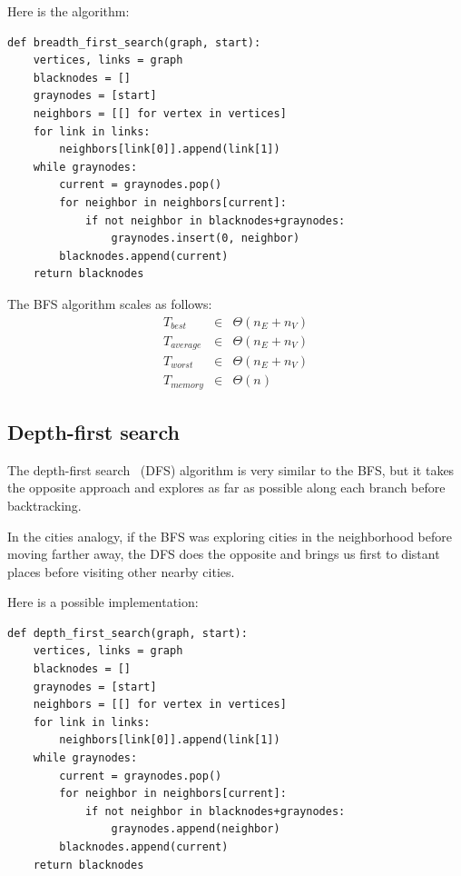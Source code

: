 \documentclass[justified, sixbynine]{tufte-book}
\def\ft{\small\tt}
\theoremstyle{plain}%
\newtheorem * {corollary}{Corollary}
\theoremstyle{definition}
\theoremstyle{remark}
\newtheorem * {remark}{Remark}
\newtheorem * {note}{Note}
\begin{document}
\begin{fullwidth}
Here is the algorithm:

\begin{lstlisting}[caption={in file: {\ft nlib.py}}]
def breadth_first_search(graph, start):
    vertices, links = graph
    blacknodes = []
    graynodes = [start]
    neighbors = [[] for vertex in vertices]
    for link in links:
        neighbors[link[0]].append(link[1])
    while graynodes:
        current = graynodes.pop()
        for neighbor in neighbors[current]:
            if not neighbor in blacknodes+graynodes:
                graynodes.insert(0, neighbor)
        blacknodes.append(current)
    return blacknodes
\end{lstlisting}

The BFS algorithm scales as follows:
\begin{eqnarray}
T_{best} &\in &\Theta (n_E+n_V) \\
T_{average} &\in &\Theta (n_E+n_V) \\
T_{worst} &\in &\Theta (n_E+n_V) \\
T_{memory} &\in &\Theta (n)
\end{eqnarray}

\subsection{Depth-first search}


The depth-first search~\cite{dfs} (DFS) algorithm is very similar to the BFS, but it takes the opposite approach and explores as far as possible along each branch before backtracking.

In the cities analogy, if the BFS was exploring cities in the neighborhood before moving farther away, the DFS does the opposite and brings us first to distant places before visiting other nearby cities.

Here is a possible implementation:

\begin{lstlisting}[caption={in file: {\ft nlib.py}}]
def depth_first_search(graph, start):
    vertices, links = graph
    blacknodes = []
    graynodes = [start]
    neighbors = [[] for vertex in vertices]
    for link in links:
        neighbors[link[0]].append(link[1])
    while graynodes:
        current = graynodes.pop()
        for neighbor in neighbors[current]:
            if not neighbor in blacknodes+graynodes:
                graynodes.append(neighbor)
        blacknodes.append(current)
    return blacknodes
\end{lstlisting}


\end{fullwidth}
\end{document}

